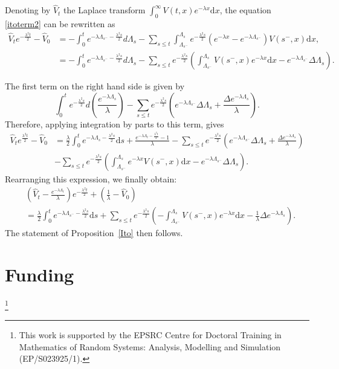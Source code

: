 \documentclass[11pt]{article}
\theoremstyle{plain}
\theoremstyle{remark}
\theoremstyle{definition}
\numberwithin{equation}{section}
\begin{document}
Denoting by $\hat V_t$ the Laplace transform $\int_{0}^\infty V(t,x)e^{-\lambda x}\textrm{d}x$, the equation \eqref{itoterm2} can be rewritten as 
\begin{align*}
    \hat V_te^{-\frac{\lambda^2t}{2}}-\hat V_0&=-\int_0^te^{-\lambda \Lambda_{s^-}-\frac{\lambda^2s}{2}}d\Lambda_s-\sum_{s\leq t}\int_{\Lambda_{s^-}}^{\Lambda_s}e^{-\frac{\lambda^2s}{2}}\left(e^{-\lambda x}-e^{-\lambda \Lambda_{s^-}}\right)V(s^-,x)\textrm{d}x,\\
    &=-\int_0^te^{-\lambda \Lambda_{s^-}-\frac{\lambda^2s}{2}}d\Lambda_s-\sum_{s\leq t}e^{-\frac{\lambda^2s}{2}}\left(\int_{\Lambda_{s^-}}^{\Lambda_s}V(s^-,x)e^{-\lambda x}\textrm{d}x-e^{-\lambda \Lambda_{s^-}}\Delta \Lambda_s\right).
\end{align*}

The first term on the right hand side is given by 
$$\int_0^te^{-\frac{\lambda^2s}{2}}d\left(\frac{e^{-\lambda \Lambda_s}}{\lambda }\right)-\sum_{s\leq t}e^{-\frac{\lambda^2s}{2}}\left(e^{-\lambda \Lambda_{s^-}}\Delta \Lambda_s+\frac{\Delta e^{-\lambda \Lambda_s} }{\lambda}\right).$$
Therefore, applying integration by parts to this term, gives
\begin{align*}
    \hat V_te^{\frac{\lambda^2t}{2}}-\hat V_0&=\frac{\lambda }{2}\int_0^te^{-\lambda \Lambda_s-\frac{\lambda^2s}{2}}\textrm{d}s+\frac{e^{-\lambda \Lambda_t-\frac{\lambda^2t}{2}}-1}{\lambda}-\sum_{s\leq t}e^{-\frac{\lambda^2s}{2}}\left(e^{-\lambda \Lambda_{s^-}}\Delta\Lambda_s+\frac{\Delta e^{-\lambda \Lambda_s}}{\lambda}\right)\\
    &-\sum_{s\leq t}e^{-\frac{\lambda^2s}{2}}\left(\int_{\Lambda_{s^-}}^{\Lambda_s}e^{-\lambda x}V(s^-,x)\textrm{d}x-e^{-\lambda\Lambda_{s^-}}\Delta \Lambda_s\right).\end{align*}
Rearranging this expression, we finally obtain:
\begin{align*}
    &\left(\hat V_t-\frac{e^{-\lambda \Lambda_t}}{\lambda}\right)e^{-\frac{\lambda^2t}{2}}+\left(\frac{1}{\lambda}-\hat V_0\right)\\
    &=\frac{\lambda}{2}\int_0^te^{-\lambda\Lambda_{s^-}-\frac{\lambda^2s}{2}}\textrm{d}s+\sum_{s\leq t}e^{-\frac{\lambda^2s}{2}}\left(-\int_{\Lambda_{s^-}}^{\Lambda_s}V(s^-,x)e^{-\lambda x}\textrm{d}x-\frac{1}{\lambda}\Delta e^{-\lambda\Lambda_s}\right).
\end{align*}
The statement of Proposition~\ref{Ito} then follows.
\section*{Funding}
\thanks{This work is supported by the EPSRC Centre for Doctoral
Training in Mathematics of Random Systems: Analysis, Modelling and Simulation (EP/S023925/1).}




\end{document}
